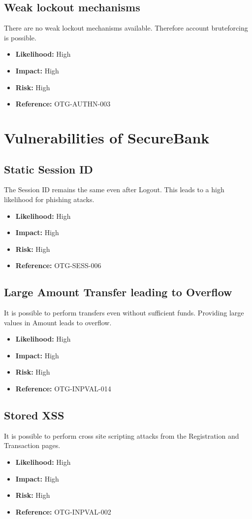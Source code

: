 \subsection{Weak lockout mechanisms}
There are no weak lockout mechanisms available. Therefore account bruteforcing is possible.
\begin{itemize}
	\item \textbf{Likelihood:} High
	\item \textbf{Impact:} High
	\item \textbf{Risk:} High
	\item \textbf{Reference:} OTG-AUTHN-003
\end{itemize}

\section{Vulnerabilities of SecureBank}

\subsection{Static Session ID}
The Session ID remains the same even after Logout.
This leads to a high likelihood for phishing atacks.
\begin{itemize}
	\item \textbf{Likelihood:} High
	\item \textbf{Impact:} High
	\item \textbf{Risk:} High
	\item \textbf{Reference:} OTG-SESS-006
\end{itemize}

\subsection{Large Amount Transfer leading to Overflow}
It is possible to perform transfers even without sufficient funds.
Providing large values in Amount leads to overflow.
\begin{itemize}
	\item \textbf{Likelihood:} High
	\item \textbf{Impact:} High
	\item \textbf{Risk:} High
	\item \textbf{Reference:} OTG-INPVAL-014
\end{itemize}

\subsection{Stored XSS}
It is possible to perform cross site scripting attacks from the Registration and Transaction pages.
\begin{itemize}
	\item \textbf{Likelihood:} High
	\item \textbf{Impact:} High
	\item \textbf{Risk:} High
	\item \textbf{Reference:} OTG-INPVAL-002
\end{itemize}

